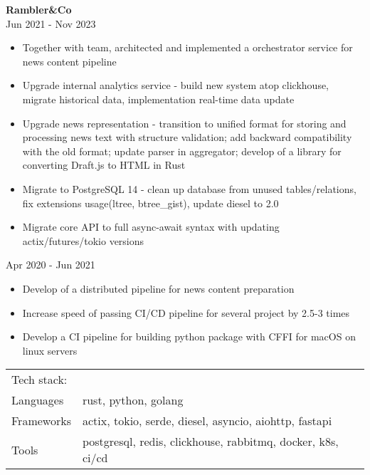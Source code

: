 \documentclass[a4paper]{article}
\begin{document}
\textbf{Rambler\&Co} \\
 \hfill Jun 2021 - Nov 2023\\
\vspace{-1mm}
\begin{itemize}[leftmargin=16pt,itemsep=0pt,topsep=2pt,label={-}]
    \item Together with team, architected and implemented a orchestrator service for news content pipeline
    \item Upgrade internal analytics service - build new system atop clickhouse, migrate historical data, implementation real-time data update
    \item Upgrade news representation - transition to unified format for storing and processing news text with structure validation; add backward compatibility with the old format; update parser in aggregator; develop of a library for converting Draft.js to HTML in Rust
    \item Migrate to PostgreSQL 14 - clean up database from unused tables/relations, fix extensions usage(ltree, btree\_gist), update diesel to 2.0
    \item Migrate core API to full async-await syntax with updating actix/futures/tokio versions
\end{itemize}
 \hfill Apr 2020 - Jun 2021\\
\begin{itemize}[leftmargin=16pt,itemsep=0pt,topsep=-8pt,label={-}]
    \item Develop of a distributed pipeline for news content preparation
    \item Increase speed of passing CI/CD pipeline for several project by 2.5-3 times
    \item Develop a CI pipeline for building python package with CFFI for macOS on linux servers
\end{itemize}
\begin{table}[h!]
    \begin{tabular}{ l l }
        Tech stack:& \\
        Languages  & rust, python, golang \\
        Frameworks & actix, tokio, serde, diesel, asyncio, aiohttp, fastapi \\
        Tools      & postgresql, redis, clickhouse, rabbitmq, docker, k8s, ci/cd \\
    \end{tabular}
\end{table}
\end{document}
